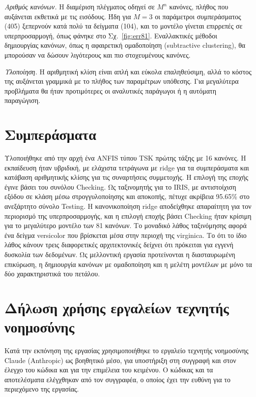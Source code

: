 \documentclass[conference]{IEEEtran}
\begin{document}
\textit{Αριθμός κανόνων.} Η διαμέριση πλέγματος οδηγεί σε $M^n$ κανόνες, πλήθος
που αυξάνεται εκθετικά με τις εισόδους. Ήδη για $M=3$ οι παράμετροι
συμπεράσματος (405) ξεπερνούν κατά πολύ τα δείγματα (104), και το μοντέλο
γίνεται επιρρεπές σε υπερπροσαρμογή, όπως φάνηκε στο Σχ.~\ref{fig:err81}.
Εναλλακτικές μέθοδοι δημιουργίας κανόνων, όπως η αφαιρετική ομαδοποίηση
(subtractive clustering), θα μπορούσαν να δώσουν λιγότερους και πιο στοχευμένους
κανόνες.

\textit{Υλοποίηση.} Η αριθμητική κλίση είναι απλή και εύκολα επαληθεύσιμη, αλλά το
κόστος της αυξάνεται γραμμικά με το πλήθος των παραμέτρων υπόθεσης. Για
μεγαλύτερα προβλήματα θα ήταν προτιμότερες οι αναλυτικές παράγωγοι ή η αυτόματη
παραγώγιση.

\section{Συμπεράσματα}

Υλοποιήθηκε από την αρχή ένα ANFIS τύπου TSK πρώτης τάξης με 16 κανόνες. Η εκπαίδευση
ήταν υβριδική, με ελάχιστα τετράγωνα με ridge για τα συμπεράσματα και κατάβαση
αριθμητικής κλίσης για τις συναρτήσεις συμμετοχής. Η επιλογή της εποχής έγινε βάσει
του συνόλου Checking. Ως ταξινομητής για το IRIS, με αντιστοίχιση εξόδου σε κλάση
μέσω στρογγυλοποίησης και αποκοπής, πέτυχε ακρίβεια 95.65\% στο ανεξάρτητο
σύνολο Testing. Η κανονικοποίηση ridge αποδείχθηκε απαραίτητη για τον περιορισμό
της υπερπροσαρμογής, και η επιλογή εποχής βάσει Checking ήταν κρίσιμη για το
μεγαλύτερο μοντέλο των 81 κανόνων. Το μοναδικό λάθος ταξινόμησης αφορά ένα
δείγμα versicolor που βρίσκεται μέσα στην περιοχή της virginica. Το ότι το ίδιο λάθος
κάνουν τρεις διαφορετικές αρχιτεκτονικές δείχνει ότι πρόκειται για εγγενή
δυσκολία των δεδομένων. Ως μελλοντική εργασία προτείνονται η διασταυρωμένη
επικύρωση, η δημιουργία κανόνων με ομαδοποίηση και η μελέτη μοντέλων με
μόνο τα δύο χαρακτηριστικά του πετάλου.

\section*{Δήλωση χρήσης εργαλείων τεχνητής νοημοσύνης}
Κατά την εκπόνηση της εργασίας χρησιμοποιήθηκε το εργαλείο τεχνητής νοημοσύνης
Claude (Anthropic) ως βοηθητικό μέσο, για υποστήριξη στη συγγραφή και στον έλεγχο
του κώδικα και για την επιμέλεια του κειμένου. Ο κώδικας και τα αποτελέσματα
ελέγχθηκαν από τον συγγραφέα, ο οποίος έχει την ευθύνη για το περιεχόμενο της εργασίας.
\end{document}
